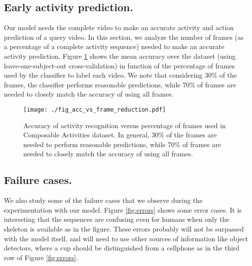\subsection{Early activity prediction.}
Our model needs the complete video to make an accurate activity and action
prediction of a query video. In this section, we analyze the number of frames
(as a percentage of a complete activity sequence) needed
to make an accurate activity prediction. Figure \ref{fig:accuracy_reduced_frames}
shows the mean accuracy over the dataset (using leave-one-subject-out
cross-validation) in function of the
percentage of frames used by the classifier to label each video. We note that
considering 30\% of the frames, the classifier performs reasonable predictions,
while 70\% of frames are needed to closely match the
accuracy of using all frames.
\begin{figure}[tb]
\begin{center}
\texttt{[image: ./fig\_acc\_vs\_frame\_reduction.pdf]}
\end{center}
\caption{Accuracy of activity recognition versus percentage of frames used in
Composable Activities dataset. In general, 30\% of the frames are needed to
perform reasonable predictions, while 70\% of frames are needed to closely match the
accuracy of using all frames.}
\label{fig:accuracy_reduced_frames}
\end{figure}

\subsection{Failure cases.}

We also study some of the failure cases that we observe during the
experimentation with our model.
Figure \ref{fig:errors} shows some error cases. It is interesting that
the sequences are confusing even for humans when only the skeleton is available
as in the figure. These errors probably will not be surpassed with the model
itself, and will need to use other sources of information like object
detectors, where a cup should be distinguished from a cellphone as in the
third row of Figure \ref{fig:errors}.

